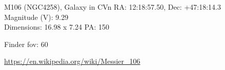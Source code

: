 \begin{block}{M106 (NGC4258), Galaxy in CVn}
    RA: 12:18:57.50, Dec: +47:18:14.3 \\ 
    Magnitude (V): 9.29 \\ 
    Dimensions: 16.98 x 7.24 PA: 150 

    Finder fov: 60 

    \url{https://en.wikipedia.org/wiki/Messier_106} 
\end{block}